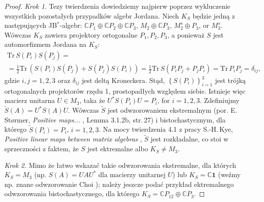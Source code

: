 \begin{proof}
\emph{Krok 1.}
Tezy twierdzenia dowiedziemy najpierw poprzez wykluczenie wszystkich
pozostałych przypadków algebr Jordana.
Niech $K_{S}$ będzie jedną z następujących JB$^{*}$-algebr:
$\mathbb{C} P_{1} \oplus \mathbb{C} P_{2} \oplus \mathbb{C} P_{3}$,
$M_{2} \oplus \mathbb{C} P_{3}$,
$M_{2}^{s} \oplus P_{3}$, or $M_{3}^{s}$.
Wówczas $K_{S}$ zawiera projektory ortogonalne $P_{1}, P_{2}, P_{3}$,
a ponieważ $S$ jest automorfizmem Jordana na $K_{S}$:
\begin{multline}
    \text{Tr} \, S(P_{i}) S(P_{j}) = \\
= \frac{1}{2} \text{Tr} \, \left( S(P_{i}) S(P_{j}) + S(P_{j}) S(P_{i}) \right)=
\frac{1}{2} \text{Tr} \, S(P_{i} P_{j} + P_{j} P_{i})=
\text{Tr} \, P_{i} P_{j} = \delta_{ij},
\end{multline}
gdzie $i,j = 1,2,3$ oraz $\delta_{ij}$ jest deltą Kroneckera.
Stąd, $\left\{S(P_{i})\right\}_{i=1}^{3}$
jest trójką ortogonalnych projektorów rzędu 1, prostopadłych względem siebie.
Istnieje więc macierz unitarna $U \in M_{3}$, taka że
$U^{*} S(P_{i}) U = P_{i}$, for $i = 1,2,3$.
Zdefiniujmy $\tilde{S}(A) = U^{*} S(A) U$.
Wówczas $\tilde{S}$ jest odwzorowaniem ekstremalnym
(por. E.\,St{\o}rmer, \emph{Positive maps...} \cite{Stormer2013}, Lemma 3.1.2b, str.\,27)
i bistochastycznym, dla którego
$\tilde{S}(P_{i}) = P_{i}$, $i = 1,2,3$.
Na mocy twierdzenia 4.1 z pracy
S.-H.\,Kye, \emph{Positive linear maps between matrix algebras}
\cite{kye1995positive},
$\tilde{S}$ jest rozkładalne,
co stoi w sprzeczności z faktem, że $S$ jest ektremalne albo $K_{S} \neq M_{3}$.

\emph{Krok 2.}
Mimo że łatwo wskazać takie odwzorowania ekstremalne, dla których
$K_{S}=M_{3}$ (np. $S(A) = U A U^{*}$ dla macierzy unitarnej $U$)
lub $K_{S}=\mathbb{C} \mathbf{1}$
(weźmy np. znane odwzorowanie Choi
\cite{choi1977extremal});
należy jeszcze podać przykład ektremalnego odwzorowania bistochastycznego,
dla którego
$K_{S}= \mathbb{C} P_{12} \oplus \mathbb{C} P_{3}$.


\end{proof}
